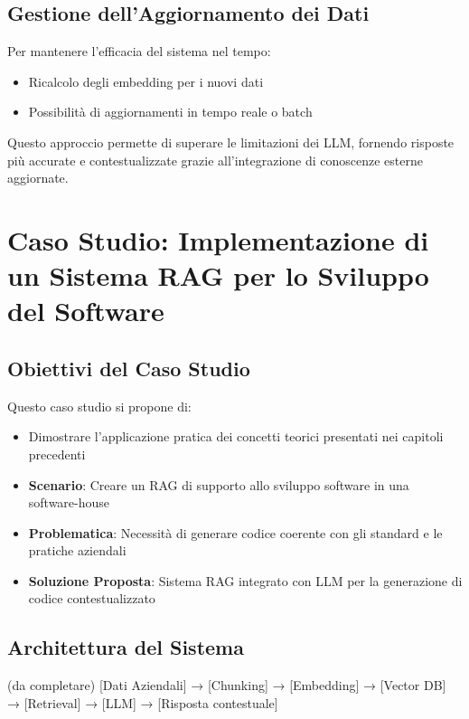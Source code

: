 \documentclass[12pt,a4paper,openright,twoside]{book}
\begin{document}
\section{Gestione dell'Aggiornamento dei Dati}
Per mantenere l'efficacia del sistema nel tempo:
\begin{itemize}
    \item Ricalcolo degli embedding per i nuovi dati
    \item Possibilità di aggiornamenti in tempo reale o batch
\end{itemize}

Questo approccio permette di superare le limitazioni dei LLM, fornendo risposte più accurate e contestualizzate grazie all'integrazione di conoscenze esterne aggiornate.

\chapter{Caso Studio: Implementazione di un Sistema RAG per lo Sviluppo del Software}

\section{Obiettivi del Caso Studio}
Questo caso studio si propone di:
\begin{itemize}
    \item Dimostrare l'applicazione pratica dei concetti teorici presentati nei capitoli precedenti
    \item \textbf{Scenario}: Creare un RAG di supporto allo sviluppo software in una software-house
    \item \textbf{Problematica}: Necessità di generare codice coerente con gli standard e le pratiche aziendali
    \item \textbf{Soluzione Proposta}: Sistema RAG integrato con LLM per la generazione di codice contestualizzato
\end{itemize}


\section{Architettura del Sistema}
(da completare)
[Dati Aziendali] → [Chunking] → [Embedding] → [Vector DB] → [Retrieval] → [LLM] → [Risposta contestuale]
\end{document}
